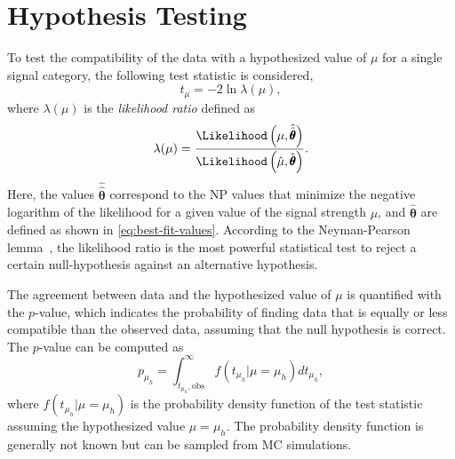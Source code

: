 \section{Hypothesis Testing}
\label{sec:hypothesis-testing}
To test the compatibility of the data with a hypothesized value of $\mu$ for a single signal category, the following test statistic is considered,
\begin{equation}
    t_\mu = -2 \ln \lambda(\mu),
\end{equation}
where $\lambda(\mu)$ is the \emph{likelihood ratio} defined as
\begin{equation}
    \label{eq:likelihoodratio}
    \lambda(\mu) = \frac{ \Likelihood \left( \mu, \hat{\hat{\pmb{\theta}}} \right) } { \Likelihood \left( \hat{\mu} , \hat{\pmb{\theta}} \right) }.
\end{equation}
Here, the values $\hat{\hat{\pmb{\theta}}}$ correspond to the NP values that minimize the negative logarithm of the likelihood for a given value of the signal strength $\mu$, and $\hat{\pmb{\theta}}$ are defined as shown in \cref{eq:best-fit-values}. 
According to the Neyman-Pearson lemma~\cite{10.2307/91247}, the likelihood ratio is the most powerful statistical test to reject a certain null-hypothesis against an alternative hypothesis.

The agreement between data and the hypothesized value of $\mu$ is quantified with the $p$-value, which indicates the probability of finding data that is equally or less compatible than the observed data, assuming that the null hypothesis is correct.
The $p$-value can be computed as
\begin{equation}
    \label{eq:p-value-discovery}
    p_{\mu_h} = \int_{t_{\mu_h}, \text{obs}}^{\infty} f \left( t_{\mu_h} | \mu = \mu_h \right) dt_{\mu_h},
\end{equation}
where $f \left( t_{\mu_h} | \mu=\mu_h \right)$ is the probability density function of the test statistic assuming the hypothesized value $\mu=\mu_h$.
The probability density function is generally not known but can be sampled from MC simulations. 

